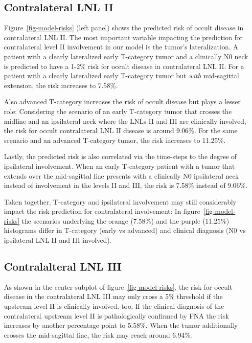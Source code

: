 \documentclass[
  sn-mathphys-num,
]{sn-jnl}
\begin{document}
\subsection{Contralateral LNL II}\label{contralateral-lnl-ii}

Figure~\ref{fig-model-risks} (left panel) shows the predicted risk of
occult disease in contralateral LNL II. The most important variable
impacting the prediction for contralateral level II involvement in our
model is the tumor's lateralization. A patient with a clearly
lateralized early T-category tumor and a clinically N0 neck is predicted
to have a 1-2\% risk for occult disease in contralateral LNL II. For a
patient with a clearly lateralized early T-category tumor but
\emph{with} mid-sagittal extension, the risk increases to 7.58\%.

Also advanced T-category increases the risk of occult disease but plays
a lesser role: Considering the scenario of an early T-category tumor
that crosses the midline and an ipsilateral neck where the LNLs II and
III are clinically involved, the risk for occult contralateral LNL II
disease is around 9.06\%. For the same scenario and an advanced
T-category tumor, the risk increases to 11.25\%.

Lastly, the predicted risk is also correlated via the time-steps to the
degree of ipsilateral involvement. When an early T-category patient with
a tumor that extends over the mid-sagittal line presents with a
clinically N0 ipsilateral neck instead of involvement in the levels II
and III, the risk is 7.58\% instead of 9.06\%.

Taken together, T-category and ipsilateral involvement may still
considerably impact the risk prediction for contralateral involvement:
In figure~\ref{fig-model-risks} the scenarios underlying the orange
(7.58\%) and the purple (11.25\%) histograms differ in T-category (early
vs advanced) and clinical diagnosis (N0 vs ipsilateral LNL II and III
involved).

\subsection{Contralalteral LNL III}\label{contralalteral-lnl-iii}

As shown in the center subplot of figure~\ref{fig-model-risks}, the risk
for occult disease in the contralateral LNL III may only cross a 5\%
threshold if the upstream level II is clinically involved, too. If the
clinical diagnosis of the contralateral upstream level II is
pathologically confirmed by FNA the risk increases by another percentage
point to 5.58\%. When the tumor additionally crosses the mid-sagittal
line, the risk may reach around 6.94\%.
\end{document}

